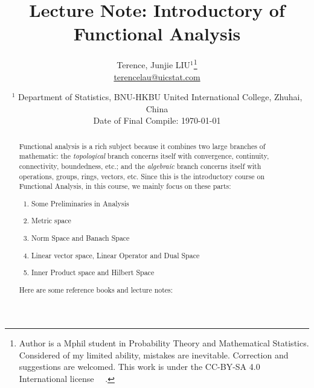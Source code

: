 \documentclass[10pt, a4paper]{article}
\title{Lecture Note: Introductory of Functional Analysis}
\author{Terence, Junjie LIU$^1$\thanks{Author is a Mphil student in Probability Theory and Mathematical Statistics. Considered of my limited ability, mistakes are inevitable. Correction and suggestions are welcomed. This work is under the CC-BY-SA 4.0 International license \faCreativeCommons\ \faCreativeCommonsBy\ \faCreativeCommonsSa.} \\ \href{terencelau@uicstat.com}{terencelau@uicstat.com}}
\date{$^1$ Department of Statistics, BNU-HKBU United International College, Zhuhai, China \\ Date of Final Compile: \today}
\begin{document}
\maketitle 

\begin{abstract}
\noindent Functional analysis is a rich subject because it combines two large branches of mathematic: the \textit{topological} branch concerns itself with convergence, continuity,
connectivity, boundedness, etc.; and the \textit{algebraic} branch concerns itself with operations, groups, rings, vectors, etc. Since this is the introductory course on Functional Analysis, in this course, we mainly focus on these parts:

    \begin{enumerate}
        \item Some Preliminaries in Analysis
        \item Metric space
        \item Norm Space and Banach Space
        \item Linear vector space, Linear Operator and Dual Space
        \item Inner Product space and Hilbert Space
    \end{enumerate}
    
\noindent Here are some reference books and lecture notes:
    

\end{abstract}
\end{document}
